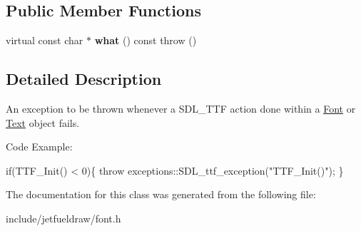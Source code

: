 \subsection*{Public Member Functions}
\begin{DoxyCompactItemize}
\item 
\mbox{\label{classjetfuel_1_1draw_1_1exceptions_1_1SDL__ttf__exception_a55dd657b789c9df2b3373ce5d671e79a}} 
virtual const char $\ast$ {\bfseries what} () const  throw ()
\end{DoxyCompactItemize}


\subsection{Detailed Description}
An exception to be thrown whenever a S\+D\+L\+\_\+\+T\+TF action done within a \hyperlink{classjetfuel_1_1draw_1_1Font}{Font} or \hyperlink{classjetfuel_1_1draw_1_1Text}{Text} object fails.

Code Example\+: 
\begin{DoxyCode}
\textcolor{keywordflow}{if}(TTF\_Init() < 0)\{
    \textcolor{keywordflow}{throw} exceptions::SDL\_ttf\_exception(\textcolor{stringliteral}{"TTF\_Init()"});
\}
\end{DoxyCode}
 

The documentation for this class was generated from the following file\+:\begin{DoxyCompactItemize}
\item 
include/jetfueldraw/font.\+h\end{DoxyCompactItemize}
